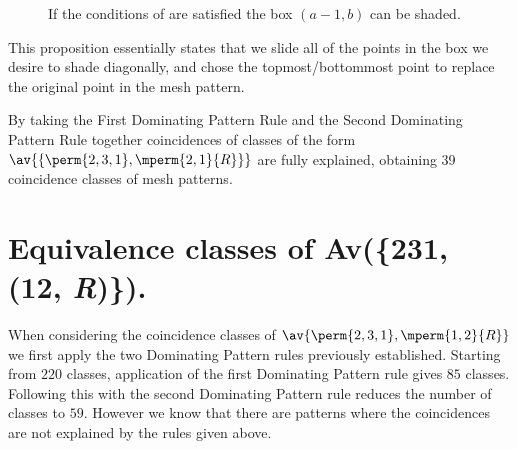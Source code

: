 \begin{figure}[ht]
\centering
{}
    \caption{If the conditions of  are satisfied the box
    \((a-1,b)\) can be shaded.}
\end{figure}

This proposition essentially states that we slide all of the points in the box we desire
to shade diagonally, and chose the topmost/bottommost point to replace the original
point in the mesh pattern.

By taking the First Dominating Pattern Rule and the Second Dominating Pattern
Rule together coincidences of classes of the form \(\av{\{\perm{2,3,1},\mperm{2,1}{R}\}}\)
are fully explained, obtaining 39 coincidence classes of mesh patterns.

\section{Equivalence classes of Av(\{231, (12, \textit{R})\}).}
When considering the coincidence classes of \(\av{\perm{2,3,1},\mperm{1,2}{R}}\)
we first apply the two Dominating Pattern rules previously established.
Starting from \(220\) classes, application of the first Dominating Pattern rule
gives \(85\) classes. Following this with the second Dominating Pattern rule
reduces the number of classes to \(59\). However we know that there are patterns
where the coincidences are not explained by the rules given above.

